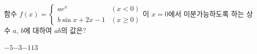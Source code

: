 함수 $f(x)=\begin{cases} ae^x & (x<0) \\ b\sin x+2x-1 & (x\ge 0) \end{cases}$이 $x=0$에서 미분가능하도록 하는 상수 $a$, $b$에 대하여 $ab$의 값은?
\begin{choices32}{$-5$}{$-3$}{$-1$}{$1$}{$3$}\end{choices32}
